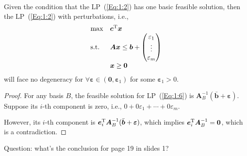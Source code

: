\begin{lemma}
Given the condition that the LP~(\ref{Eq:1:2}) has one basic feasible solution, then the LP~(\ref{Eq:1:2}) with perturbations, i.e., 
\begin{equation}\label{Eq:1:6}
\begin{array}{ll}
\max&\bm c^{\mathrm T}\bm x\\
\text{s.t.}&\bm{Ax}\le\bm b+\begin{pmatrix}
\varepsilon_1\\\vdots\\\varepsilon_m
\end{pmatrix}\\
&\bm x\ge\bm0
\end{array}
\end{equation}
will face no degeneracy for $\forall \bm\varepsilon\in(\bm0,\bm\varepsilon_1)$ for some $\bm\varepsilon_1>0$.

\end{lemma}
\begin{proof}
For any basis $B$, the feasible solution for LP~(\ref{Eq:1:6}) is $\bm A_B^{-1}(\bar{\bm b}+\bm\varepsilon)$. Suppose its $i$-th component is zero, i.e., $0+0\varepsilon_1+\cdots+0\varepsilon_m$.

However, its $i$-th component is $\bm e_i^{\mathrm T}\bm A_B^{-1}(\bar{\bm b}+\bm\varepsilon)$, which implies $\bm e_i^{\mathrm T}\bm A_B^{-1}=\bm0$, which is a contradiction.
\end{proof}
Question: what's the conclusion for page 19 in slides 1?

